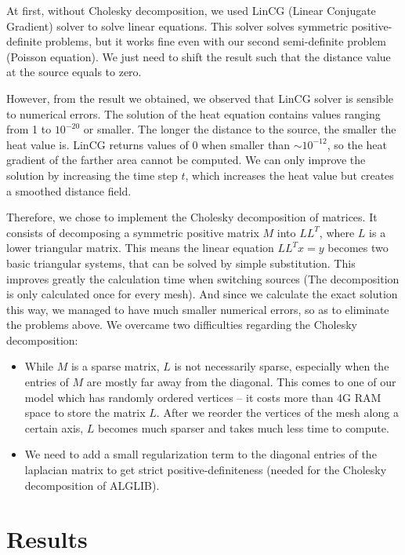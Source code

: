 \documentclass[a4paper,12pt,twoside]{article}
\begin{document}
At first, without Cholesky decomposition, we used LinCG (Linear Conjugate Gradient) solver to solve linear equations. This solver solves symmetric positive-definite problems, but it works fine even with our second semi-definite problem (Poisson equation). We just need to shift the result such that the distance value at the source equals to zero.

However, from the result we obtained, we observed that LinCG solver is sensible to numerical errors. The solution of the heat equation contains values ranging from 1 to $10^{-20}$ or smaller. The longer the distance to the source, the smaller the heat value is. LinCG returns values of 0 when smaller than $\sim 10^{-12}$, so the heat gradient of the farther area cannot be computed. We can only improve the solution by increasing the time step $t$, which increases the heat value but creates a smoothed distance field.

Therefore, we chose to implement the Cholesky decomposition of matrices. It consists of decomposing a symmetric positive matrix $M$ into $LL^T$, where $L$ is a lower triangular matrix. This means the linear equation $LL^Tx = y$ becomes two basic triangular systems, that can be solved by simple substitution. This improves greatly the calculation time when switching sources (The decomposition is only calculated once for every mesh). And since we calculate the exact solution this way, we managed to have much smaller numerical errors, so as to eliminate the problems above. 
We overcame two difficulties regarding the Cholesky decomposition: 

\begin{itemize}
\item
While $M$ is a sparse matrix, $L$ is not necessarily sparse, especially when the entries of $M$ are mostly far away from the diagonal. This comes to one of our model which has randomly ordered vertices – it costs more than 4G RAM space to store the matrix $L$. After we reorder the vertices of the mesh along a certain axis, $L$ becomes much sparser and takes much less time to compute.
\item
We need to add a small regularization term to the diagonal entries of the laplacian matrix to get strict positive-definiteness (needed for the Cholesky decomposition of ALGLIB).
\end{itemize}

\section{Results}
\end{document}
